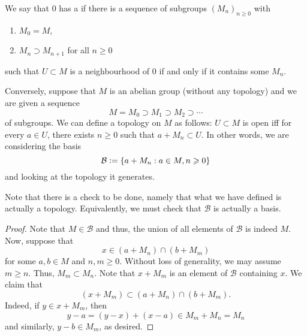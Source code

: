 \begin{defn}
	We say that $0$ has a  if there is a sequence of subgroups $(M_{n})_{n \ge 0}$ with
	\begin{enumerate}
		\item $M_{0} = M$,
		\item $M_{n} \supset M_{n + 1}$ for all $n \ge 0$
	\end{enumerate}
	such that $U \subset M$ is a neighbourhood of $0$ if and only if it contains some $M_{n}$.
\end{defn}

Conversely, suppose that $M$ is an abelian group (without any topology) and we are given a sequence
\begin{equation*} 
	M = M_{0} \supset M_{1} \supset M_{2} \supset \cdots
\end{equation*}
of subgroups. We can define a topology on $M$ as follows: $U \subset M$ is open iff for every $a \in U$, there exists $n \ge 0$ such that $a + M_{n} \subset U$. \newline
In other words, we are considering the basis
\begin{equation*} 
	\mathcal{B} \vcentcolon= \{a + M_{n} : a \in M, n \ge 0\}
\end{equation*}
and looking at the topology it generates. 

Note that there is a check to be done, namely that what we have defined is actually a topology. Equivalently, we must check that $\mathcal{B}$ is actually a basis. 

\begin{proof}
	Note that $M \in \mathcal{B}$ and thus, the union of all elements of $\mathcal{B}$ is indeed $M$. Now, suppose that
	\begin{equation*} 
		x \in (a + M_{n}) \cap (b + M_{m})
	\end{equation*}
	for some $a, b \in M$ and $n, m \ge 0$. Without loss of generality, we may assume $m \ge n$. Thus, $M_{m} \subset M_{n}$. \newline
	Note that $x + M_{m}$ is an element of $\mathcal{B}$ containing $x$. We claim that
	\begin{equation*} 
		(x + M_{m}) \subset (a + M_{n}) \cap (b + M_{m}).
	\end{equation*}
	Indeed, if $y \in x + M_{m}$, then
	\begin{equation*} 
		y - a = (y - x) + (x - a) \in M_{m} + M_{n} = M_{n}
	\end{equation*}
	and similarly, $y - b \in M_{m}$, as desired.
\end{proof}

